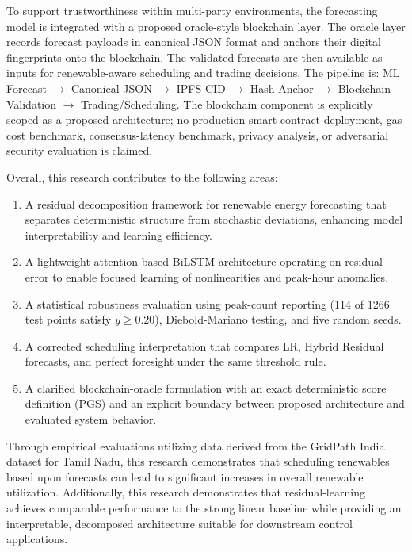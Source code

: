 \documentclass{ieeeaccess}
\begin{document}
To support trustworthiness within multi-party environments, the forecasting model is integrated with a proposed oracle-style blockchain layer. The oracle layer records forecast payloads in canonical JSON format and anchors their digital fingerprints onto the blockchain. The validated forecasts are then available as inputs for renewable-aware scheduling and trading decisions. The pipeline is: ML Forecast $\rightarrow$ Canonical JSON $\rightarrow$ IPFS CID $\rightarrow$ Hash Anchor $\rightarrow$ Blockchain Validation $\rightarrow$ Trading/Scheduling. The blockchain component is explicitly scoped as a proposed architecture; no production smart-contract deployment, gas-cost benchmark, consensus-latency benchmark, privacy analysis, or adversarial security evaluation is claimed.

Overall, this research contributes to the following areas:
\begin{enumerate}
\item A residual decomposition framework for renewable energy forecasting that separates deterministic structure from stochastic deviations, enhancing model interpretability and learning efficiency.
\item A lightweight attention-based BiLSTM architecture operating on residual error to enable focused learning of nonlinearities and peak-hour anomalies.
\item A statistical robustness evaluation using peak-count reporting (114 of 1266 test points satisfy $y \ge 0.20$), Diebold-Mariano testing, and five random seeds.
\item A corrected scheduling interpretation that compares LR, Hybrid Residual forecasts, and perfect foresight under the same threshold rule.
\item A clarified blockchain-oracle formulation with an exact deterministic score definition (PGS) and an explicit boundary between proposed architecture and evaluated system behavior.
\end{enumerate}

Through empirical evaluations utilizing data derived from the GridPath India dataset for Tamil Nadu, this research demonstrates that scheduling renewables based upon forecasts can lead to significant increases in overall renewable utilization. Additionally, this research demonstrates that residual-learning achieves comparable performance to the strong linear baseline while providing an interpretable, decomposed architecture suitable for downstream control applications.
\end{document}
